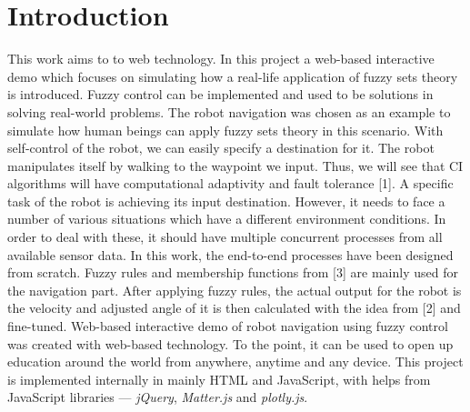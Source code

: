 \documentclass[paper=a4, fontsize=11pt]{scrartcl}
\numberwithin{equation}{section}		%
\numberwithin{figure}{section}			%
\numberwithin{table}{section}				%
\begin{document}
	\section{Introduction}
	This work aims to  to web technology.
	\linebreak \linebreak
	In this project a web-based interactive demo which focuses on simulating how a real-life application of fuzzy sets theory is introduced. Fuzzy control can be implemented and used to be solutions in solving real-world problems. The robot navigation was chosen as an example to simulate how human beings can apply fuzzy sets theory in this scenario. With self-control of the robot, we can easily specify a destination for it. The robot manipulates itself by walking to the waypoint we input. Thus, we will see that CI algorithms will have computational adaptivity and fault tolerance [1].
	\linebreak \linebreak
	A specific task of the robot is achieving its input destination. However, it needs to face a number of various situations which have a different environment conditions. In order to deal with these, it should have multiple concurrent processes from all available sensor data. In this work, the end-to-end processes have been designed from scratch. Fuzzy rules and membership functions from [3] are mainly used for the navigation part. After applying fuzzy rules, the actual output for the robot is the velocity and adjusted angle of it is then calculated with the idea from [2] and fine-tuned.
	\linebreak \linebreak
	Web-based interactive demo of robot navigation using fuzzy control was created with web-based technology. To the point, it can be used to open up education around the world from anywhere, anytime and any device. This project is implemented internally in mainly HTML and JavaScript, with helps from JavaScript libraries --- \textit{jQuery}, \textit{Matter.js} and \textit{plotly.js}.
	
\end{document}
